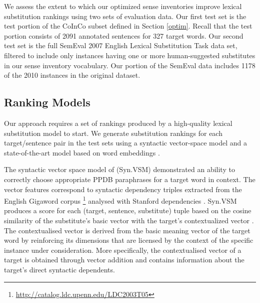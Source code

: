 \documentclass[11pt]{article}
\begin{document}

We assess the extent to which our optimized sense inventories improve lexical substitution rankings using two sets of evaluation data. Our first test set is the test portion of the CoInCo subset defined in Section \ref{optim}. Recall that the test portion consists of 2091 annotated sentences for 327 target words. Our second test set is the full SemEval 2007 English Lexical Substitution Task \cite{mccarthy-navigli:07} data set, filtered to include only instances having one or more human-suggested substitutes in our sense inventory vocabulary. Our portion of the SemEval data includes 1178 of the 2010 instances in the original dataset.   


\subsection{Ranking Models}

Our approach requires a set of rankings produced by a high-quality lexical substitution model to start. We generate substitution rankings for each target/sentence pair in the test sets using a syntactic vector-space model \cite{thater-furstenau-pinkal:2011:IJCNLP-2011,apidianaki:2016:EMNLP2016} and a state-of-the-art model based on word embeddings \cite{melamud-levy-dagan:2015:VSM-NLP}. 

The syntactic vector space model of  (Syn.VSM) demonstrated an ability to correctly choose appropriate PPDB paraphrases for a target word in context. The vector features correspond to syntactic dependency triples extracted from the English Gigaword corpus \footnote{\url{http://catalog.ldc.upenn.edu/LDC2003T05}} analysed with Stanford dependencies \cite{mcdm:06}. Syn.VSM produces a score for each (target, sentence, substitute) tuple based on the cosine similarity of the substitute's basic vector with the target's contextualized vector \cite{thater-furstenau-pinkal:2011:IJCNLP-2011}. The contextualised vector is derived from the basic meaning vector of the target word by reinforcing its dimensions that are licensed by the context of the specific instance under consideration. More specifically, the contextualised vector of a target is obtained through vector addition and contains information about the target's direct syntactic dependents. %
\end{document}
